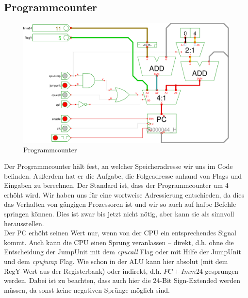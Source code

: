\subsection{Programmcounter}
\begin{figure}[!ht]
\centering
\includegraphics[width=1\textwidth]{images/pc.eps}
\caption{\label{HW:PC}Programmcounter}
\end{figure}
Der Programmcounter hält fest, an welcher Speicheradresse wir uns im Code befinden. Außerdem hat er die Aufgabe, die Folgeadresse anhand von Flags und Eingaben zu berechnen.
Der Standard ist, dass der Programmcounter um 4 erhöht wird. Wir haben uns für eine wortweise Adressierung entschieden, da dies das Verhalten von gängigen Prozessoren ist und wir so auch auf halbe Befehle springen können. Dies ist zwar bis jetzt nicht nötig, aber kann sie als sinnvoll herausstellen.\\
Der PC erhöht seinen Wert nur, wenn von der CPU ein entsprechendes Signal kommt. Auch kann die CPU einen Sprung veranlassen -- direkt, d.h. ohne die Entscheidung der JumpUnit mit dem \emph{cpucall} Flag oder mit Hilfe der JumpUnit und dem \emph{cpujump} Flag. Wie schon in der ALU kann hier absolut (mit dem RegY-Wert aus der Registerbank) oder indirekt, d.h. $PC+Imm24$ gesprungen werden. Dabei ist zu beachten, dass auch hier die 24-Bit Sign-Extended werden müssen, da sonst keine negativen Sprünge möglich sind.

